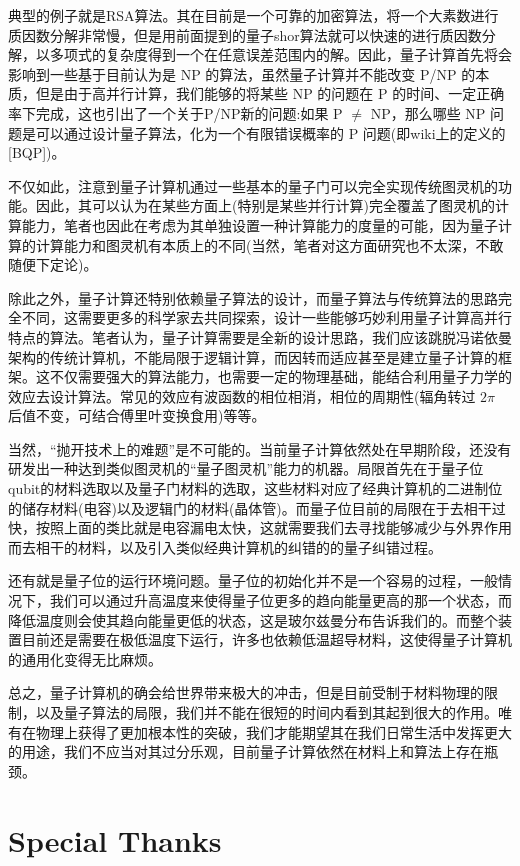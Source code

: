 \documentclass[fontset=windows]{article}
\begin{document}
典型的例子就是RSA算法。其在目前是一个可靠的加密算法，将一个大素数进行质因数分解非常慢，但是用前面提到的量子shor算法就可以快速的进行质因数分解，以多项式的复杂度得到一个在任意误差范围内的解。因此，量子计算首先将会影响到一些基于目前认为是 NP 的算法，虽然量子计算并不能改变 P/NP 的本质，但是由于高并行计算，我们能够的将某些 NP 的问题在 P 的时间、一定正确率下完成，这也引出了一个关于P/NP新的问题:如果 P $\not = $ NP，那么哪些 NP 问题是可以通过设计量子算法，化为一个有限错误概率的 P 问题(即wiki上的定义的[BQP])。

不仅如此，注意到量子计算机通过一些基本的量子门可以完全实现传统图灵机的功能。因此，其可以认为在某些方面上(特别是某些并行计算)完全覆盖了图灵机的计算能力，笔者也因此在考虑为其单独设置一种计算能力的度量的可能，因为量子计算的计算能力和图灵机有本质上的不同(当然，笔者对这方面研究也不太深，不敢随便下定论)。

除此之外，量子计算还特别依赖量子算法的设计，而量子算法与传统算法的思路完全不同，这需要更多的科学家去共同探索，设计一些能够巧妙利用量子计算高并行特点的算法。笔者认为，量子计算需要是全新的设计思路，我们应该跳脱冯诺依曼架构的传统计算机，不能局限于逻辑计算，而因转而适应甚至是建立量子计算的框架。这不仅需要强大的算法能力，也需要一定的物理基础，能结合利用量子力学的效应去设计算法。常见的效应有波函数的相位相消，相位的周期性(辐角转过 $2\pi$ 后值不变，可结合傅里叶变换食用)等等。

当然，“抛开技术上的难题”是不可能的。当前量子计算依然处在早期阶段，还没有研发出一种达到类似图灵机的“量子图灵机”能力的机器。局限首先在于量子位qubit的材料选取以及量子门材料的选取，这些材料对应了经典计算机的二进制位的储存材料(电容)以及逻辑门的材料(晶体管)。而量子位目前的局限在于去相干过快，按照上面的类比就是电容漏电太快，这就需要我们去寻找能够减少与外界作用而去相干的材料，以及引入类似经典计算机的纠错的的量子纠错过程。

还有就是量子位的运行环境问题。量子位的初始化并不是一个容易的过程，一般情况下，我们可以通过升高温度来使得量子位更多的趋向能量更高的那一个状态，而降低温度则会使其趋向能量更低的状态，这是玻尔兹曼分布告诉我们的。而整个装置目前还是需要在极低温度下运行，许多也依赖低温超导材料，这使得量子计算机的通用化变得无比麻烦。

总之，量子计算机的确会给世界带来极大的冲击，但是目前受制于材料物理的限制，以及量子算法的局限，我们并不能在很短的时间内看到其起到很大的作用。唯有在物理上获得了更加根本性的突破，我们才能期望其在我们日常生活中发挥更大的用途，我们不应当对其过分乐观，目前量子计算依然在材料上和算法上存在瓶颈。

\section*{Special Thanks}
\end{document}
